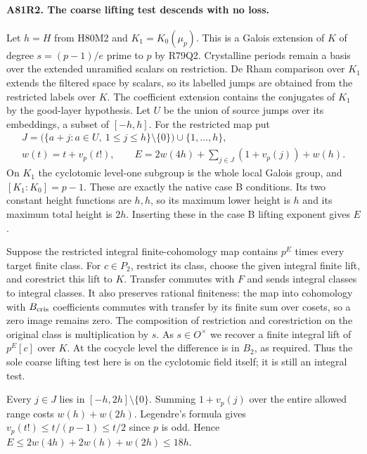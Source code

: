 \paragraph{A81R2. The coarse lifting test descends with no loss.}
Let $h=H$ from H80M2 and $K_1=K_0(\mu_p)$. This is a Galois
extension of $K$ of degree $s=(p-1)/e$ prime to $p$ by R79Q2.
Crystalline periods remain a basis over the extended unramified
scalars on restriction. De Rham comparison over $K_1$ extends the
filtered space by scalars, so its labelled jumps are obtained from
the restricted labels over $K$. The coefficient extension contains
the conjugates of $K_1$ by the good-layer hypothesis. Let $U$ be
the union of source jumps over its embeddings, a subset of $[-h,h]$.
For the restricted map put
\[
\begin{gathered}
 J=\big(\{a+j:a\in U,\ 1\le j\le h\}\setminus\{0\}\big)
                  \cup\{1,\ldots,h\},\\
 w(t)=t+v_p(t!),\qquad
 E=2w(4h)+\sum_{j\in J}(1+v_p(j))+w(h).
\end{gathered}
\]
On $K_1$ the cyclotomic level-one subgroup is the whole local
Galois group, and $[K_1:K_0]=p-1$. These are exactly the native
case B conditions. Its two constant height functions are $h,h$,
so its maximum lower height is $h$ and its maximum total height
is $2h$. Inserting these in the case B lifting exponent gives $E$.

Suppose the restricted integral finite-cohomology map contains
$p^E$ times every target finite class. For $c\in P_2$, restrict
its class, choose the given integral finite lift, and corestrict
this lift to $K$. Transfer commutes with $F$ and sends integral
classes to integral classes. It also preserves rational finiteness:
the map into cohomology with $B_{\rm cris}$ coefficients commutes
with transfer by its finite sum over cosets, so a zero image
remains zero. The composition of restriction and corestriction
on the original class is multiplication by $s$. As $s\in O^\times$
we recover a finite integral lift of $p^E[c]$ over $K$.
At the cocycle level the difference is in $B_2$, as required.
Thus the sole coarse lifting test here is on the cyclotomic
field itself; it is still an integral test.

Every $j\in J$ lies in $[-h,2h]\setminus\{0\}$. Summing
$1+v_p(j)$ over the entire allowed range costs $w(h)+w(2h)$.
Legendre's formula gives $v_p(t!)\le t/(p-1)\le t/2$ since
$p$ is odd. Hence $E\le2w(4h)+2w(h)+w(2h)\le18h$.

